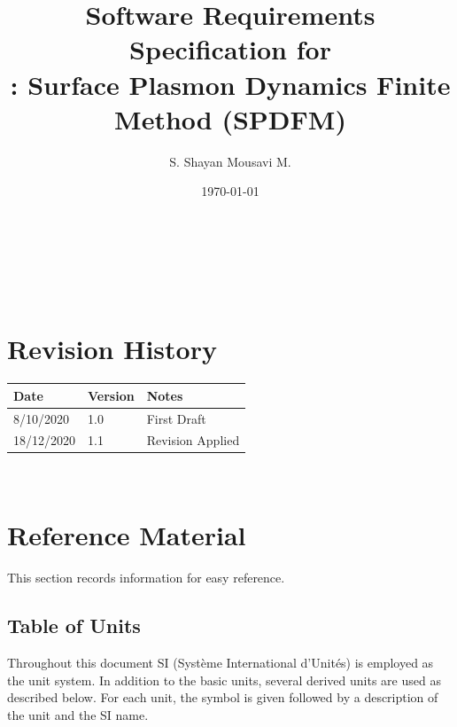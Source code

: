 \documentclass[12pt]{article}
\begin{document}
	
	\title{Software Requirements Specification for\\ \progname: Surface Plasmon
		Dynamics Finite Method (SPDFM)} \author{S. Shayan Mousavi M.} \date{\today}
	
	\maketitle
	
	~\newpage
	
	
	\tableofcontents
	
	~\newpage
	
	\section*{Revision History}
	
	\begin{tabularx}{\textwidth}{p{3cm}p{2cm}X} \toprule {\bf Date} & {\bf Version}
		& {\bf Notes}\\ \midrule 8/10/2020 & 1.0 & First Draft\\ 18/12/2020 & 1.1 & Revision Applied\\
		\bottomrule \end{tabularx}
	
	~\newpage
	
	\section{Reference Material}
	
	This section records information for easy reference.
	
	\subsection{Table of Units}
	
	Throughout this document SI (Syst\`{e}me International d'Unit\'{e}s) is employed
	as the unit system.  In addition to the basic units, several derived units are
	used as described below.  For each unit, the symbol is given followed by a
	description of the unit and the SI name. ~\newline
	
\end{document}
